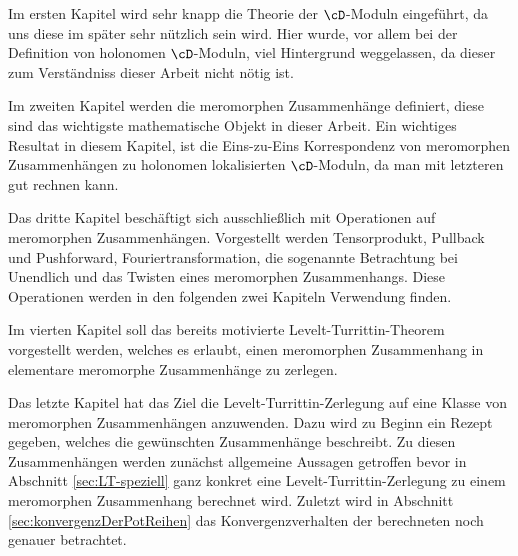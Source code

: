 Im ersten Kapitel wird sehr knapp die Theorie der $\cD$-Moduln eingeführt, da
uns diese im später sehr nützlich sein wird. Hier wurde, vor allem bei der
Definition von holonomen $\cD$-Moduln, viel Hintergrund weggelassen, da dieser
zum Verständniss dieser Arbeit nicht nötig ist.\\
\begin{comment} \end{comment}
Im zweiten Kapitel werden die meromorphen Zusammenhänge definiert, diese sind
das wichtigste mathematische Objekt in dieser Arbeit.
Ein wichtiges Resultat in diesem Kapitel, ist die Eins-zu-Eins Korrespondenz
von meromorphen Zusammenhängen zu holonomen lokalisierten $\cD$-Moduln, da man
mit letzteren gut rechnen kann.\\
\begin{comment} \end{comment}
Das dritte Kapitel beschäftigt sich ausschließlich mit Operationen auf
meromorphen Zusammenhängen.
Vorgestellt werden Tensorprodukt, Pullback und Pushforward,
Fouriertransformation, die sogenannte Betrachtung bei Unendlich und das Twisten
eines meromorphen Zusammenhangs.
Diese Operationen werden in den folgenden zwei Kapiteln Verwendung finden.\\
\begin{comment} \end{comment}
Im vierten Kapitel soll das bereits motivierte Levelt-Turrittin-Theorem
vorgestellt werden, welches es erlaubt, einen meromorphen Zusammenhang in
elementare meromorphe Zusammenhänge zu zerlegen.\\
\begin{comment} \end{comment}
Das letzte Kapitel hat das Ziel die Levelt-Turrittin-Zerlegung auf eine Klasse
von meromorphen Zusammenhängen anzuwenden.
Dazu wird zu Beginn ein Rezept gegeben, welches die gewünschten Zusammenhänge
beschreibt.
Zu diesen Zusammenhängen werden zunächst allgemeine Aussagen getroffen bevor in
Abschnitt \ref{sec:LT-speziell} ganz konkret eine Levelt-Turrittin-Zerlegung zu
einem meromorphen Zusammenhang berechnet wird.
Zuletzt wird in Abschnitt \ref{sec:konvergenzDerPotReihen} das
Konvergenzverhalten der berechneten noch genauer betrachtet.

\begin{comment}
Ich möchte diese Stelle nutzen, um Herrn Prof. Dr. Hien dafür zu danken, dass
er mir ermöglicht hat, mich mit diesem Thema zu beschäftigen.
Auch bedanke ich mich für die hervorragende Betreuung, welche diese Arbeit erst
ermöglicht hat.
\end{comment}

